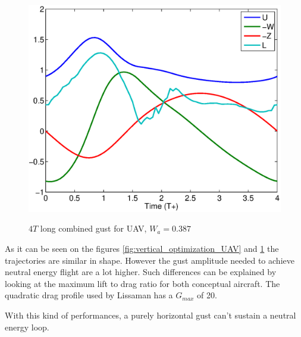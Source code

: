 \begin{figure}[h]
  \begin{center}
    \scalebox{0.8}
    {\includegraphics{./Figures/Windtype=3_Tg=4_Wg=0p387_UAV_alphamax=12.eps}}
  \end{center}
  \caption{$4T$ long combined gust for UAV, $W_a=0.387$}
  \label{fig:combined_optimization_UAV}
\end{figure}

As it can be seen on the figures \ref{fig:vertical_optimization_UAV} and \ref{fig:combined_optimization_UAV} the trajectories are similar in shape. However the gust amplitude needed to achieve neutral energy flight are a lot higher.
Such differences can be explained by looking at the maximum lift to drag ratio for both conceptual aircraft.
The quadratic drag profile used by Lissaman has a $G_{max}$ of 20.

\FloatBarrier

\par With this kind of performances, a purely horizontal gust can't sustain a neutral energy loop.

\FloatBarrier

%

